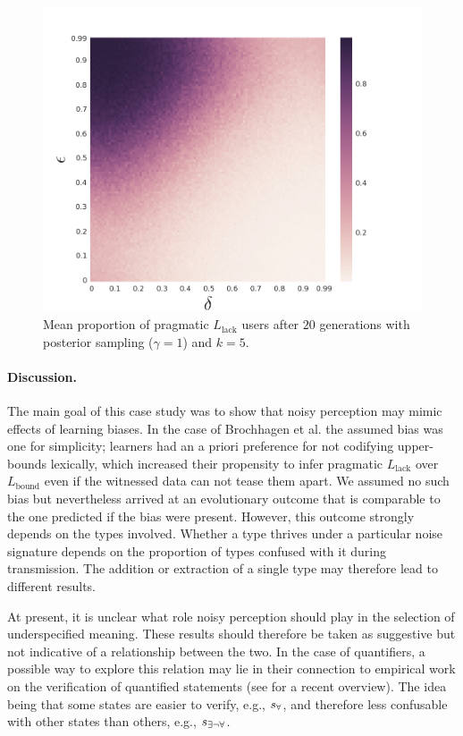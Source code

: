 \documentclass[10pt,a4paper]{article}
\newcommand{\state}{\ensuremath{s}\xspace}		%
\newcommand{\mystate}[1]{\ensuremath{\state_{\text{#1}}}\xspace} %
\newcommand{\ssome}{\mystate{\ensuremath{\exists\neg\forall}}}
\newcommand{\sall}{\mystate{\ensuremath{\forall}}}
\newcommand{\postparameter}{\ensuremath{\gamma}}
\begin{document}
\begin{figure}[ht]
\centering
    \includegraphics[scale=0.33]{../code/plots/quantifiers-posterior-sampling-k5.png}
  \caption{Mean proportion of pragmatic $L_{\text{lack}}$ users after $20$ generations with posterior sampling ($\postparameter = 1$) and $k = 5$.}
  \label{fig:quant}
\end{figure}


\paragraph{Discussion.} The main goal of this case study was to show that noisy perception may
mimic effects of learning biases. In the case of Brochhagen et al. the assumed bias was one
for simplicity; learners had an a priori preference for not codifying 
upper-bounds lexically, which increased their propensity to infer pragmatic
$L_{\text{lack}}$ over $L_{\text{bound}}$ even if the witnessed data can not tease them
apart. We assumed no such bias but nevertheless arrived at an evolutionary outcome that
is comparable to the one predicted if the bias were present. However, this outcome
strongly depends on the types involved. Whether a type thrives under a particular noise
signature depends on the proportion of types confused with it during transmission. The addition
or extraction of a single type may therefore lead to different results.

At present, it is unclear what role noisy perception should play in the selection of underspecified meaning. These results should therefore be taken as suggestive but not indicative of a relationship between the two. In the case of quantifiers, a possible way to explore this relation may lie in their connection to empirical work on the verification of quantified statements (see \citealt{szymanik:2016} for a recent overview). The idea being that some states are easier to verify, e.g., $\sall$, and therefore less confusable with other states than others, e.g., $\ssome$. 
\end{document}
